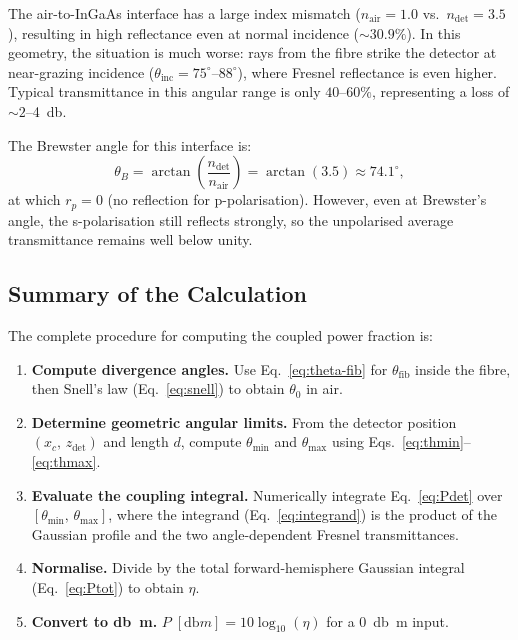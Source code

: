 The air-to-InGaAs interface has a large index mismatch
($n_\text{air} = 1.0$ vs.\ $n_\text{det} = 3.5$), resulting in high
reflectance even at normal incidence (${\sim}30.9\%$).  In this geometry,
the situation is much worse: rays from the fibre strike the detector at
near-grazing incidence ($\theta_\text{inc} = 75^\circ$--$88^\circ$),
where Fresnel reflectance is even higher.  Typical transmittance in this
angular range is only $40$--$60\%$, representing a loss of
${\sim}2$--\SI{4}{\decibel}.

The Brewster angle for this interface is:
\begin{equation}
  \theta_B = \arctan\!\left(\frac{n_\text{det}}{n_\text{air}}\right)
  = \arctan(3.5)
  \approx 74.1^\circ,
\end{equation}
at which $r_p = 0$ (no reflection for p-polarisation).  However, even
at Brewster's angle, the s-polarisation still reflects strongly, so the
unpolarised average transmittance remains well below unity.

\subsection{Summary of the Calculation}

The complete procedure for computing the coupled power fraction is:
%
\begin{enumerate}
  \item \textbf{Compute divergence angles.}
    Use Eq.~\eqref{eq:theta-fib} for $\theta_\text{fib}$ inside the
    fibre, then Snell's law (Eq.~\ref{eq:snell}) to obtain
    $\theta_0$ in air.

  \item \textbf{Determine geometric angular limits.}
    From the detector position $(x_c,\, z_\text{det})$ and length $d$,
    compute $\theta_\text{min}$ and $\theta_\text{max}$ using
    Eqs.~\eqref{eq:thmin}--\eqref{eq:thmax}.

  \item \textbf{Evaluate the coupling integral.}
    Numerically integrate Eq.~\eqref{eq:Pdet} over
    $[\theta_\text{min},\, \theta_\text{max}]$, where the integrand
    (Eq.~\ref{eq:integrand}) is the product of the Gaussian profile
    and the two angle-dependent Fresnel transmittances.

  \item \textbf{Normalise.}
    Divide by the total forward-hemisphere Gaussian integral
    (Eq.~\ref{eq:Ptot}) to obtain $\eta$.

  \item \textbf{Convert to \si{\decibel m}.}
    $P\;[\si{\decibel m}] = 10\log_{10}(\eta)$ for a \SI{0}{\decibel m}
    input.
\end{enumerate}

